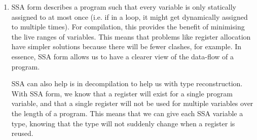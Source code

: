 \begin{enumerate}[label=(\alph*)]
  \item
    SSA form describes a program such that every variable is only statically assigned to at most once (i.e. if in a loop, it might get dynamically assigned to multiple times). For compilation, this provides the benefit of minimising the live ranges of variables. This means that problems like register allocation have simpler solutions because there will be fewer clashes, for example. In essence, SSA form allows us to have a clearer view of the data-flow of a program.

    SSA can also help is in decompilation to help us with type reconstruction. With SSA form, we know that a register will exist for a single program variable, and that a single register will not be used for multiple variables over the length of a program. This means that we can give each SSA variable a type, knowing that the type will not suddenly change when a register is reused.

        
    \end{enumerate}

